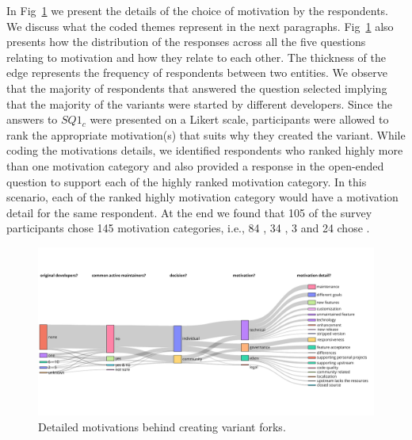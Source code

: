 In Fig~\ref{fig:sankey_motivation} we present the details of the choice of motivation by the respondents. We discuss what the coded themes represent in the next paragraphs.
Fig~\ref{fig:sankey_motivation} also presents how the distribution of the responses across all the five questions relating to motivation and how they relate to each other. The thickness of the edge represents the frequency of respondents between two entities.
We observe that
the majority of respondents that answered the question  selected  implying that the majority of the variants were started by different developers.
Since the answers to $SQ1_{c}$ were presented on a Likert scale, participants were allowed to rank the appropriate motivation(s) that suits why they created the variant. While coding the motivations details, we identified respondents who ranked highly more than one motivation category and also provided a response in the open-ended question to support each of the highly ranked motivation category. In this scenario, each of the ranked highly motivation category would have a motivation detail for the same respondent. 
At the end we found that 105 of the survey participants chose 145 motivation categories, i.e., 84 , 34 , 3  and 24 chose . 

\begin{figure}[ht]
\begin{center}
    \centering
    \includegraphics[width=\textwidth]{pdfs/sankey_motivations_2.pdf}
    \caption{Detailed motivations behind creating variant forks.
    }
    \label{fig:sankey_motivation}
\end{center}
\vspace{-.3cm}
\end{figure}


